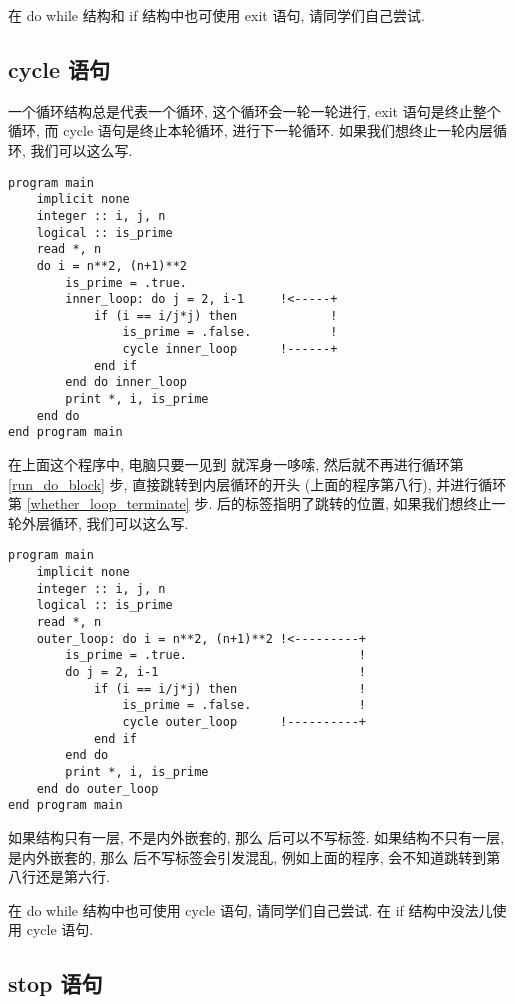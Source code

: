 在 do while 结构和 if 结构中也可使用 exit 语句, 请同学们自己尝试.

\subsection{cycle 语句}\label{fortran_cycle}

一个循环结构总是代表一个循环, 这个循环会一轮一轮进行, exit 语句是终止整个循环, 而 cycle 语句是终止本轮循环, 进行下一轮循环. 如果我们想终止一轮内层循环, 我们可以这么写.
\begin{lstlisting}
program main
    implicit none
    integer :: i, j, n
    logical :: is_prime
    read *, n
    do i = n**2, (n+1)**2
        is_prime = .true.
        inner_loop: do j = 2, i-1     !<-----+
            if (i == i/j*j) then             !
                is_prime = .false.           !
                cycle inner_loop      !------+
            end if
        end do inner_loop
        print *, i, is_prime
    end do
end program main
\end{lstlisting}
在上面这个程序中, 电脑只要一见到  就浑身一哆嗦, 然后就不再进行循环第 \ref{run_do_block} 步, 直接跳转到内层循环的开头 (上面的程序第八行), 并进行循环第 \ref{whether_loop_terminate} 步.  后的标签指明了跳转的位置, 如果我们想终止一轮外层循环, 我们可以这么写.
\begin{lstlisting}
program main
    implicit none
    integer :: i, j, n
    logical :: is_prime
    read *, n
    outer_loop: do i = n**2, (n+1)**2 !<---------+
        is_prime = .true.                        !
        do j = 2, i-1                            !
            if (i == i/j*j) then                 !
                is_prime = .false.               !
                cycle outer_loop      !----------+
            end if
        end do
        print *, i, is_prime
    end do outer_loop
end program main
\end{lstlisting}

如果结构只有一层, 不是内外嵌套的, 那么  后可以不写标签. 如果结构不只有一层, 是内外嵌套的, 那么  后不写标签会引发混乱, 例如上面的程序, 会不知道跳转到第八行还是第六行.

在 do while 结构中也可使用 cycle 语句, 请同学们自己尝试. 在 if 结构中没法儿使用 cycle 语句.

\subsection{stop 语句}

